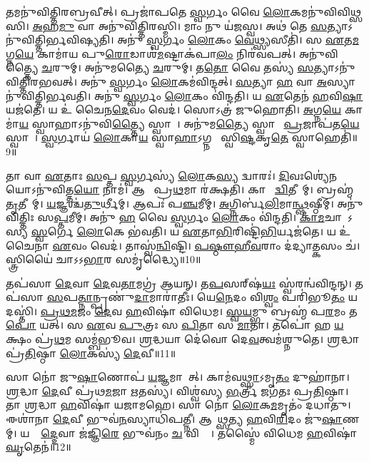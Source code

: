    𑌤𑌮𑌨𑍁॑𑌵𑌿𑌤𑍍𑌤𑌿𑌰𑌬𑍍𑌰𑌵𑍀𑌤𑍍।
   𑌪𑍍𑌰𑌜𑌾॑𑌪𑌤𑍇 \ul{𑌸𑍍𑌵}𑌰𑍍𑌗𑌂 𑌵𑍈 \ul{𑌲𑍋}𑌕𑌮𑌨𑍁॑𑌵𑌿𑌵𑌿𑌥𑍍𑌸𑌸𑌿।
   \ul{𑌅}𑌹\ul{𑌮𑍁} 𑌵𑌾 𑌅𑌨𑍁॑𑌵𑌿𑌤𑍍𑌤𑌿𑌰𑌸𑍍𑌮𑌿।
   𑌮𑌾𑌂 𑌨𑍁 𑌯॑𑌜𑌸𑍍𑌵।
   𑌅𑌥॑ 𑌤𑍇 \ul{𑌸}𑌤𑍍𑌯𑌾𑌽𑌨𑍁॑𑌵𑌿𑌤𑍍𑌤𑌿𑌰𑍍𑌭𑌵𑌿𑌷𑍍𑌯𑌤𑌿।
   𑌅𑌨𑍁॑ \ul{𑌸𑍍𑌵}𑌰𑍍𑌗𑌂 \ul{𑌲𑍋}𑌕𑌂 \ul{𑌵𑍇}𑌥𑍍𑌸𑍍𑌯𑌸𑍀𑌤𑌿॑।
   𑌸 \ul{𑌏}𑌤\ul{𑌮}𑌗𑍍𑌨\ul{𑌯𑍇} 𑌕𑌾𑌮𑌾॑𑌯 𑌪𑍁\ul{𑌰𑍋}𑌡𑌾𑌶॑\ul{𑌮}𑌷𑍍𑌟𑌾𑌕॑𑌪𑌾\ul{𑌲𑌂} 𑌨𑌿𑌰॑𑌵𑌪𑌤𑍍।
   𑌅𑌨𑍁॑𑌵𑌿𑌤𑍍𑌤𑍍𑌯𑍈 \ul{𑌚}𑌰𑍁𑌮𑍍।
   𑌅𑌨𑍁॑𑌮𑌤𑍍𑌯𑍈 \ul{𑌚}𑌰𑍁𑌮𑍍।
   𑌤\ul{𑌤𑍋} 𑌵𑍈 𑌤𑌸𑍍𑌯॑ \ul{𑌸}𑌤𑍍𑌯𑌾𑌽𑌨𑍁॑𑌵𑌿𑌤𑍍𑌤𑌿𑌰𑌭𑌵𑌤𑍍।
   𑌅𑌨𑍁॑ \ul{𑌸𑍍𑌵}𑌰𑍍𑌗𑌂 \ul{𑌲𑍋}𑌕𑌮॑𑌵𑌿𑌨𑍍𑌦𑌤𑍍।
   \ul{𑌸}𑌤𑍍𑌯𑌾 \ul{𑌹} 𑌵𑌾 \ul{𑌅}𑌸𑍍𑌯𑌾𑌨𑍁॑𑌵𑌿𑌤𑍍𑌤𑌿𑌰𑍍𑌭𑌵𑌤𑌿।
   𑌅𑌨𑍁॑ \ul{𑌸𑍍𑌵}𑌰𑍍𑌗𑌂 \ul{𑌲𑍋}𑌕𑌂 𑌵𑌿॑𑌨𑍍𑌦𑌤𑌿।
   𑌯 \ul{𑌏}𑌤𑍇𑌨॑ \ul{𑌹}𑌵𑌿\ul{𑌷𑌾} 𑌯𑌜॑𑌤𑍇।
   𑌯 𑌉॑ 𑌚𑍈𑌨\ul{𑌦𑍇}𑌵𑌂 𑌵𑍇𑌦॑।
   𑌸𑍋𑌽𑌤𑍍𑌰॑ 𑌜𑍁𑌹𑍋𑌤𑌿।
   \ul{𑌅}𑌗𑍍𑌨\ul{𑌯𑍇} 𑌕𑌾𑌮𑌾॑\ul{𑌯} 𑌸𑍍𑌵𑌾𑌹𑌾𑌽𑌨𑍁॑𑌵𑌿\ul{𑌤𑍍𑌤𑍍𑌯𑍈} 𑌸𑍍𑌵𑌾𑌹𑌾᳚।
   𑌅𑌨𑍁॑𑌮\ul{𑌤𑍍𑌯𑍈} 𑌸𑍍𑌵𑌾𑌹𑌾᳚ \ul{𑌪𑍍𑌰}𑌜𑌾𑌪॑𑌤\ul{𑌯𑍇} 𑌸𑍍𑌵𑌾𑌹𑌾᳚।
   \ul{𑌸𑍍𑌵}𑌰𑍍𑌗𑌾𑌯॑ \ul{𑌲𑍋}𑌕𑌾\ul{𑌯} 𑌸𑍍𑌵𑌾\ul{𑌹𑌾}𑌽𑌗𑍍𑌨𑌯𑍇᳚ 𑌸𑍍𑌵𑌿\ul{𑌷𑍍𑌟}𑌕𑍃\ul{𑌤𑍇} 𑌸𑍍𑌵𑌾𑌹𑍇𑌤𑌿॑॥9॥

   𑌤𑌾 𑌵𑌾 \ul{𑌏}𑌤𑌾𑌃 \ul{𑌸}𑌪𑍍𑌤 \ul{𑌸𑍍𑌵}𑌰𑍍𑌗𑌸𑍍𑌯॑ \ul{𑌲𑍋}𑌕\ul{𑌸𑍍𑌯} 𑌦𑍍𑌵𑌾𑌰𑌃॑।
   \ul{𑌦𑌿}𑌵𑌃𑌶𑍍𑌯𑍇॑\ul{𑌨}𑌯𑍋𑌽𑌨𑍁॑\-𑌵𑌿𑌤𑍍𑌤\ul{𑌯𑍋} 𑌨𑌾𑌮॑।
   𑌆𑌶𑌾᳚ 𑌪𑍍𑌰\ul{𑌥}𑌮𑌾 𑌰॑𑌕𑍍𑌷𑌤𑌿।
   𑌕𑌾𑌮𑍋᳚ \ul{𑌦𑍍𑌵𑌿}𑌤𑍀𑌯𑌾᳚𑌮𑍍।
   𑌬𑍍𑌰𑌹𑍍𑌮॑ \ul{𑌤𑍃}𑌤𑍀𑌯𑌾᳚𑌮𑍍।
   \ul{𑌯}𑌜𑍍𑌞𑌶𑍍𑌚॑\ul{𑌤𑍁}𑌰𑍍𑌥𑍀𑌮𑍍।
   𑌆𑌪𑌃॑ 𑌪\ul{𑌞𑍍𑌚}𑌮𑍀𑌮𑍍।
   \ul{𑌅}𑌗𑍍𑌨𑌿𑌰𑍍𑌬॑\ul{𑌲𑌿}𑌮𑌾\ul{𑌨𑍍𑌥𑍍𑌷}𑌷𑍍𑌠𑍀𑌮𑍍।
   𑌅𑌨𑍁॑𑌵𑌿𑌤𑍍𑌤𑌿𑌃 𑌸\ul{𑌪𑍍𑌤}𑌮𑍀𑌮𑍍।
   𑌅𑌨𑍁॑ \ul{𑌹} 𑌵𑍈 \ul{𑌸𑍍𑌵}𑌰𑍍𑌗𑌂 \ul{𑌲𑍋}𑌕𑌂 𑌵𑌿॑𑌨𑍍𑌦𑌤𑌿।
   \ul{𑌕𑌾}\ul{𑌮}𑌚𑌾𑌰𑍋᳚𑌽𑌸𑍍𑌯 \ul{𑌸𑍍𑌵}𑌰𑍍𑌗𑍇 \ul{𑌲𑍋}𑌕𑍇 𑌭॑𑌵𑌤𑌿।
   𑌯 \ul{𑌏}𑌤𑌾\ul{𑌭𑌿}𑌰𑌿𑌷𑍍𑌟𑌿॑\ul{𑌭𑌿}𑌰𑍍𑌯𑌜॑𑌤𑍇।
   𑌯 𑌉॑ 𑌚𑍈𑌨𑌾 \ul{𑌏}𑌵𑌂 𑌵𑍇𑌦॑।
   𑌤𑌾𑌸𑍍𑌵॑\ul{𑌨𑍍𑌵𑌿}𑌷𑍍𑌟𑌿।
   \ul{𑌪}\ul{𑌷𑍍𑌠𑍗}\ul{𑌹𑍀}\ul{𑌵}𑌰𑌾𑌂 𑌦॑𑌦𑍍𑌯𑌾\ul{𑌤𑍍𑌕}\ul{}𑌸𑌂 𑌚॑।
   𑌸𑍍𑌤𑍍𑌰𑌿𑌯𑍈॑ 𑌚𑌾𑌽𑌽\ul{𑌭𑌾}𑌰 𑌸𑌮𑍃॑𑌦𑍍𑌧𑍍𑌯𑍈॥10॥\anuvakamend
  
   𑌤𑌪॑𑌸𑌾 \ul{𑌦𑍇}𑌵𑌾 \ul{𑌦𑍇}𑌵\ul{𑌤𑌾}𑌮𑌗𑍍𑌰॑ 𑌆𑌯𑌨𑍍।
   𑌤\ul{𑌪}𑌸𑌰𑍍‌𑌷॑\ul{𑌯𑌃} 𑌸𑍍𑌵॑𑌰𑌨𑍍𑌵॑𑌵𑌿𑌨𑍍𑌦𑌨𑍍।
   𑌤𑌪॑𑌸𑌾 \ul{𑌸}𑌪\ul{𑌤𑍍𑌨𑌾}𑌨𑍍𑌪𑍍𑌰𑌣𑍁॑\ul{𑌦𑌾}𑌮𑌾𑌰𑌾॑𑌤𑍀𑌃।
   𑌯𑍇\ul{𑌨𑍇}𑌦𑌂 𑌵𑌿\ul{𑌶𑍍𑌵𑌂} 𑌪𑌰𑌿॑𑌭𑍂\ul{𑌤𑌂} 𑌯𑌦𑌸𑍍𑌤𑌿॑।
   \ul{𑌪𑍍𑌰}\ul{𑌥}\ul{𑌮}𑌜𑌂 \ul{𑌦𑍇}𑌵 \ul{𑌹}𑌵𑌿𑌷𑌾॑ 𑌵𑌿𑌧𑍇𑌮।
   \ul{𑌸𑍍𑌵}\ul{𑌯}𑌮𑍍𑌭𑍁 𑌬𑍍𑌰𑌹𑍍𑌮॑ 𑌪\ul{𑌰}𑌮𑌂 𑌤\ul{𑌪𑍋} 𑌯𑌤𑍍।
   𑌸 \ul{𑌏}𑌵 \ul{𑌪𑍁}𑌤𑍍𑌰𑌃 𑌸 \ul{𑌪𑌿}𑌤𑌾 𑌸 \ul{𑌮𑌾}𑌤𑌾।
   𑌤𑌪𑍋॑ 𑌹 \ul{𑌯}𑌕𑍍𑌷𑌂 𑌪𑍍𑌰॑\ul{𑌥}𑌮 𑌸𑌮𑍍𑌬॑𑌭𑍂𑌵।
   \ul{𑌶𑍍𑌰}𑌦𑍍𑌧𑌯𑌾 𑌦𑍇॑𑌵𑍋 𑌦𑍇\ul{𑌵}𑌤𑍍𑌵𑌮॑𑌶𑍍𑌨𑍁𑌤𑍇।
   \ul{𑌶𑍍𑌰}𑌦𑍍𑌧𑌾 𑌪𑍍𑌰॑\ul{𑌤𑌿}𑌷𑍍𑌠𑌾 \ul{𑌲𑍋}𑌕𑌸𑍍𑌯॑ \ul{𑌦𑍇}𑌵𑍀॥11॥

   𑌸𑌾 𑌨𑍋॑ 𑌜𑍁\ul{𑌷𑌾}𑌣𑍋𑌪॑ \ul{𑌯}𑌜𑍍𑌞𑌮𑌾𑌗𑌾᳚𑌤𑍍।
   𑌕𑌾𑌮॑𑌵\ul{𑌥𑍍𑌸𑌾}𑌽𑌮𑍃\ul{𑌤𑌂} 𑌦𑍁𑌹𑌾॑𑌨𑌾।
   \ul{𑌶𑍍𑌰}𑌦𑍍𑌧𑌾 \ul{𑌦𑍇}𑌵𑍀 𑌪𑍍𑌰॑𑌥\ul{𑌮}𑌜𑌾 \ul{𑌋}𑌤𑌸𑍍𑌯॑।
   𑌵𑌿𑌶𑍍𑌵॑𑌸𑍍𑌯 \ul{𑌭}𑌰𑍍𑌤𑍍𑌰𑍀 𑌜𑌗॑𑌤𑌃 𑌪𑍍𑌰\ul{𑌤𑌿}𑌷𑍍𑌠𑌾।
   𑌤𑌾 \ul{𑌶𑍍𑌰}𑌦𑍍𑌧𑌾 \ul{𑌹}𑌵𑌿𑌷𑌾॑ 𑌯𑌜𑌾𑌮𑌹𑍇।
   𑌸𑌾 𑌨𑍋॑ \ul{𑌲𑍋}𑌕\ul{𑌮}𑌮𑍃𑌤𑌂॑ 𑌦𑌧𑌾𑌤𑍁।
   𑌈𑌶𑌾॑𑌨𑌾 \ul{𑌦𑍇}𑌵𑍀 𑌭𑍁𑌵॑\ul{𑌨}𑌸𑍍𑌯𑌾𑌧𑌿॑𑌪𑌤𑍍𑌨𑍀।
   𑌆𑌗𑌾᳚\ul{𑌥𑍍𑌸}𑌤𑍍𑌯 \ul{𑌹}𑌵𑌿\ul{𑌰𑌿}𑌦𑌂 𑌜𑍁॑\ul{𑌷𑌾}𑌣𑌮𑍍।
   𑌯𑌸𑍍𑌮𑌾᳚\ul{𑌦𑍍𑌦𑍇}𑌵𑌾 𑌜॑𑌜𑍍𑌞𑌿\ul{𑌰𑍇} 𑌭𑍁𑌵॑𑌨𑌂 \ul{𑌚} 𑌵𑌿𑌶𑍍𑌵𑍇᳚।
   𑌤𑌸𑍍𑌮𑍈॑ 𑌵𑌿𑌧𑍇𑌮 \ul{𑌹}𑌵𑌿𑌷𑌾॑ \ul{𑌘𑍃}𑌤𑍇𑌨॑॥12॥

